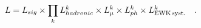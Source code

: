 \begin{equation}
L = L_{sig}\times \prod_k L_{hadronic}^k
\times L_{\mu}^k \times L_{ph}^k \times L_{\rm EWK\, syst.}^k \quad .
\end{equation}

%
%
%
%
%
%
